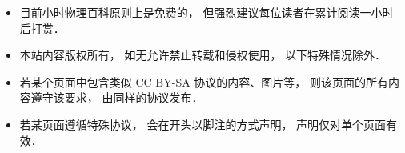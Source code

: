 
\begin{itemize}
\item 目前小时物理百科原则上是免费的， 但强烈建议每位读者在累计阅读一小时后打赏．
\item 本站内容版权所有， 如无允许禁止转载和侵权使用， 以下特殊情况除外．
\item 若某个页面中包含类似 CC BY-SA 协议的内容、图片等， 则该页面的所有内容遵守该要求， 由同样的协议发布．
\item 若某页面遵循特殊协议， 会在开头以脚注的方式声明， 声明仅对单个页面有效．
\end{itemize}
